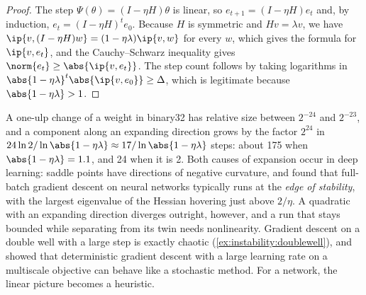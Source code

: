 \begin{refsection}
\begin{proof}
The step $\Psi(\theta)=(I-\eta H)\theta$ is linear, so $e_{t+1}=(I-\eta H)e_t$ and, by induction, $e_t=(I-\eta H)^te_0$. Because $H$ is symmetric and $Hv=\lambda v$, we have $\ip{v,(I-\eta H)w}=(1-\eta\lambda)\ip{v,w}$ for every $w$, which gives the formula for $\ip{v,e_t}$, and the Cauchy--Schwarz inequality gives $\norm{e_t}\ge\abs{\ip{v,e_t}}$. The step count follows by taking logarithms in $\abs{1-\eta\lambda}^t\abs{\ip{v,e_0}}\ge\Delta$, which is legitimate because $\abs{1-\eta\lambda}>1$.
\end{proof}

A one-ulp change of a weight in binary32 has relative size between $2^{-24}$ and $2^{-23}$, and a component along an expanding direction grows by the factor $2^{24}$ in $24\ln2/\ln\abs{1-\eta\lambda}\approx17/\ln\abs{1-\eta\lambda}$ steps: about 175 when $\abs{1-\eta\lambda}=1.1$, and 24 when it is 2. Both causes of expansion occur in deep learning: saddle points have directions of negative curvature, and \textcite{CohenEtAl2021} found that full-batch gradient descent on neural networks typically runs at the \emph{edge of stability}, with the largest eigenvalue of the Hessian hovering just above $2/\eta$. A quadratic with an expanding direction diverges outright, however, and a run that stays bounded while separating from its twin needs nonlinearity. Gradient descent on a double well with a large step is exactly chaotic (\cref{ex:instability:doublewell}), and \textcite{KongTao2020} showed that deterministic gradient descent with a large learning rate on a multiscale objective can behave like a stochastic method. For a network, the linear picture becomes a heuristic.


\end{refsection}
